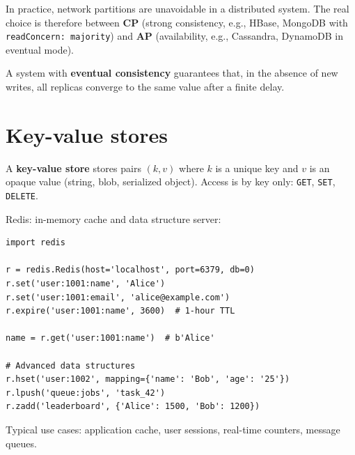 \begin{attention}
In practice, network partitions are unavoidable in a distributed system.
The real choice is therefore between \textbf{CP} (strong consistency,
e.g., HBase, MongoDB with \texttt{readConcern: majority}) and \textbf{AP}
(availability, e.g., Cassandra, DynamoDB in eventual mode).
\end{attention}

\begin{definition}
A system with \textbf{eventual consistency} guarantees that, in the absence
of new writes, all replicas converge to the same value after a finite delay.
\end{definition}

\section{Key-value stores}

\begin{definition}
A \textbf{key-value store} stores pairs $(k, v)$ where $k$ is a unique key
and $v$ is an opaque value (string, blob, serialized object). Access is by
key only: \texttt{GET}, \texttt{SET}, \texttt{DELETE}.
\end{definition}

\begin{example}
Redis: in-memory cache and data structure server:
\begin{verbatim}
import redis

r = redis.Redis(host='localhost', port=6379, db=0)
r.set('user:1001:name', 'Alice')
r.set('user:1001:email', 'alice@example.com')
r.expire('user:1001:name', 3600)  # 1-hour TTL

name = r.get('user:1001:name')  # b'Alice'

# Advanced data structures
r.hset('user:1002', mapping={'name': 'Bob', 'age': '25'})
r.lpush('queue:jobs', 'task_42')
r.zadd('leaderboard', {'Alice': 1500, 'Bob': 1200})
\end{verbatim}
\end{example}

\begin{remark}
Typical use cases: application cache, user sessions, real-time counters,
message queues.
\end{remark}

